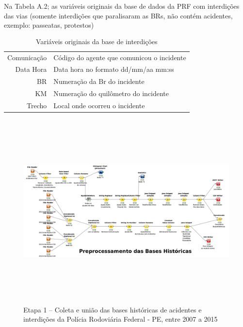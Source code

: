 \pagebreak

Na Tabela A.2; as variáveis originais da base de dados da PRF com interdições das vias 
(somente interdições que paralisaram as BRs, não contém acidentes, exemplo: passeatas, protestos) 

\begin{table}[htbp]
 \centering
  \caption{Variáveis originais da base de interdições}
  
  \begin{tabular}{r|l} \hline
   Comunicação & Código do agente que comunicou o incidente \\
   Data Hora & Data hora no formato dd/mm/aa mm:ss \\
   BR & Numeração da Br do incidente\\
   KM & Numeração do quilômetro do incidente\\
   Trecho  & Local onde ocorreu o incidente \\
  \end{tabular}
\end{table}


\begin{figure}[ht]
  \centering
    \caption{Etapa 1  -- Coleta e união das bases históricas de acidentes e interdições da Polícia Rodoviária Federal - PE, entre 2007 a 2015}
    \includegraphics[width=165mm, height=100mm]{Figuras/Cronograma/BasesHistoricas.png}
\end{figure}




